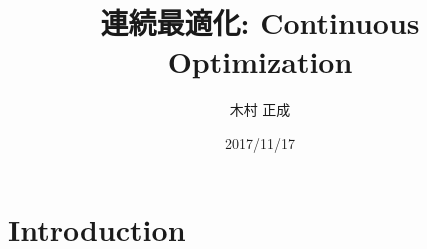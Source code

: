 \documentclass[11pt]{report}
\begin{document}
\begin{titlepage}
\title{連続最適化: Continuous Optimization}
\date{2017/11/17}
\author{木村 正成}
\maketitle
\thispagestyle{empty}
\end{titlepage}

\tableofcontents
\clearpage

\section{Introduction}



\end{document}

